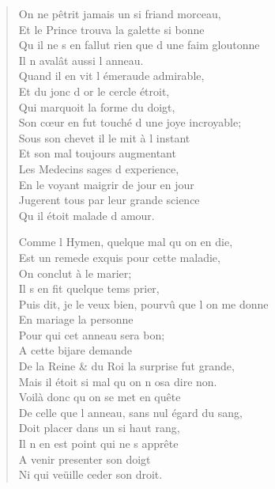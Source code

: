 \begin{verse}
On ne pêtrit jamais un si friand morceau, \\
Et le Prince trouva la galette si bonne \\
Qu\textquotesingle{} il ne s\textquotesingle{} en fallut rien que d\textquotesingle{} une faim gloutonne \\
\vin Il n\textquotesingle{} avalât aussi l\textquotesingle{} anneau. \\
\vin Quand il en vit l\textquotesingle{} émeraude admirable, \\
\vin Et du jonc d\textquotesingle{} or le cercle étroit, \\
\vin Qui marquoit la forme du doigt, \\
Son cœur en fut touché d\textquotesingle{} une joye incroyable; \\
\vin Sous son chevet il le mit à l\textquotesingle{} instant \\
\vin Et son mal toujours augmentant \\
\vin Les Medecins sages d\textquotesingle{} experience, \\
\vin En le voyant maigrir de jour en jour \\
\vin Jugerent tous par leur grande science \\
\vin Qu\textquotesingle{} il étoit malade d\textquotesingle{} amour.

\vin Comme l\textquotesingle{} Hymen, quelque mal qu\textquotesingle{} on en die, \\
Est un remede exquis pour cette maladie, \\
\vin On conclut à le marier; \\
\vin Il s\textquotesingle{} en fit quelque tems prier, \\
Puis dit, je le veux bien, pourvû que l\textquotesingle{} on me donne \\
\vin En mariage la personne \\
\vin Pour qui cet anneau sera bon; \\
\vin A cette bijare demande \\
De la Reine \& du Roi la surprise fut grande, \\
Mais il étoit si mal qu\textquotesingle{} on n\textquotesingle{} osa dire non. \\
\vin Voilà donc qu\textquotesingle{} on se met en quête \\
De celle que l\textquotesingle{} anneau, sans nul égard du sang, \\
\vin Doit placer dans un si haut rang, \\
\vin Il n\textquotesingle{} en est point qui ne s\textquotesingle{} apprête \\
\vin A venir presenter son doigt \\
\vin Ni qui veüille ceder son droit.


\end{verse}
